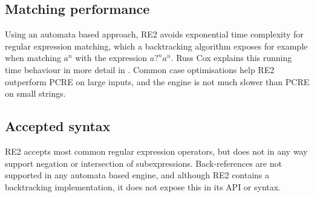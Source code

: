 \subsection{Matching performance}

Using an automata based approach, RE2 avoids exponential time complexity for
regular expression matching, which a backtracking algorithm exposes for example
when matching $a^n$ with the expression $a?^na^n$. Russ Cox explains this
running time behaviour in more detail in \cite{regexp1}. Common case
optimisations help RE2 outperform PCRE on large inputs, and the engine is
not much slower than PCRE on small strings.


\subsection{Accepted syntax}

RE2 accepts most common regular expression operators, but does not in any way
support negation or intersection of subexpressions. Back-references are not
supported in any automata based engine, and although RE2 contains a backtracking
implementation, it does not expose this in its API or syntax.


